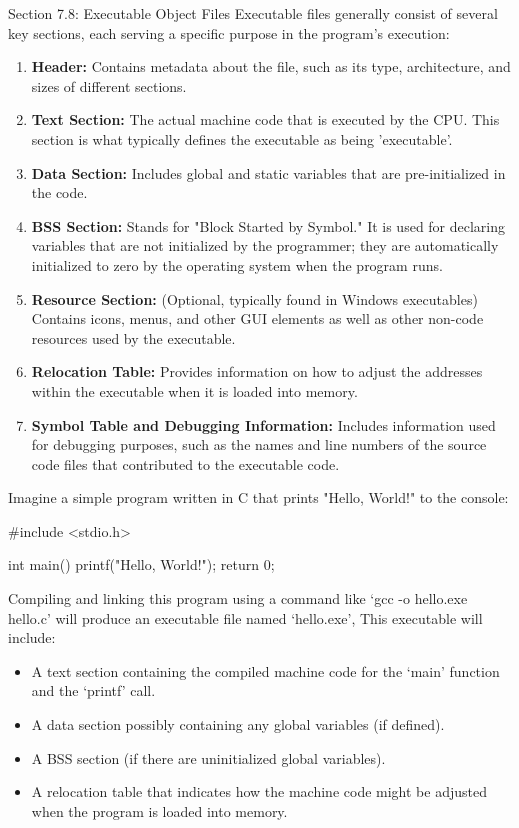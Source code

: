 \begin{notes}{Section 7.8: Executable Object Files}
    Executable files generally consist of several key sections, each serving a specific purpose in the program's execution:
    \begin{enumerate}
        \item \textbf{Header:} Contains metadata about the file, such as its type, architecture, and sizes of different sections.
        \item \textbf{Text Section:} The actual machine code that is executed by the CPU. This section is what typically defines the executable as being 'executable'.
        \item \textbf{Data Section:} Includes global and static variables that are pre-initialized in the code.
        \item \textbf{BSS Section:} Stands for "Block Started by Symbol." It is used for declaring variables that are not initialized by the programmer; they are automatically initialized to zero by 
        the operating system when the program runs.
        \item \textbf{Resource Section:} (Optional, typically found in Windows executables) Contains icons, menus, and other GUI elements as well as other non-code resources used by the executable.
        \item \textbf{Relocation Table:} Provides information on how to adjust the addresses within the executable when it is loaded into memory.
        \item \textbf{Symbol Table and Debugging Information:} Includes information used for debugging purposes, such as the names and line numbers of the source code files that contributed to the executable code.
    \end{enumerate}
    
    \begin{highlight}
        Imagine a simple program written in C that prints "Hello, World!" to the console:
    \begin{code}[C]
    #include <stdio.h>

    int main() {
        printf("Hello, World!\n");
        return 0;
    }
    \end{code}
        Compiling and linking this program using a command like `gcc -o hello.exe hello.c' will produce an executable file named `hello.exe', This executable will include:
        \begin{itemize}
            \item A text section containing the compiled machine code for the `main' function and the `printf' call.
            \item A data section possibly containing any global variables (if defined).
            \item A BSS section (if there are uninitialized global variables).
            \item A relocation table that indicates how the machine code might be adjusted when the program is loaded into memory.
        \end{itemize}
    \end{highlight}
    

\end{notes}
